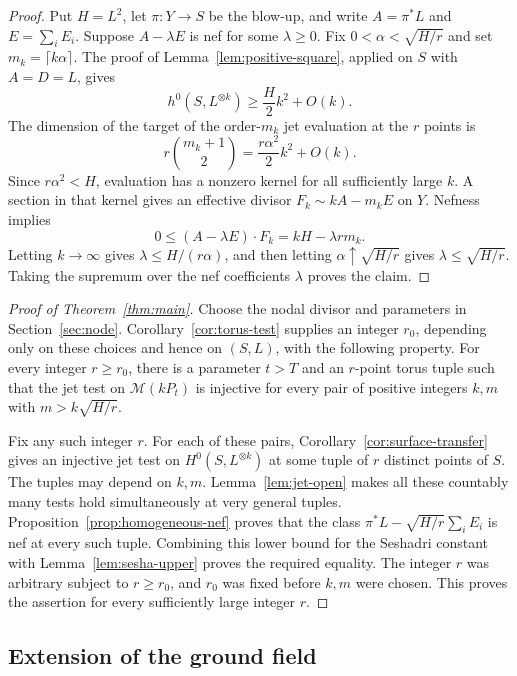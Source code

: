 \begin{proof}
Put $H=L^2$, let $\pi:Y\to S$ be the blow-up, and write
$A=\pi^*L$ and $E=\sum_iE_i$. Suppose $A-\lambda E$ is nef for
some $\lambda\ge0$. Fix $0<\alpha<\sqrt{H/r}$ and set
$m_k=\lceil k\alpha\rceil$. The proof of
Lemma~\ref{lem:positive-square}, applied on $S$ with $A=D=L$,
gives
\[
 h^0(S,L^{\otimes k})\ge \frac{H}{2}k^2+O(k).
\]
The dimension of the target of the order-$m_k$ jet evaluation at
the $r$ points is
\[
 r\binom{m_k+1}{2}=\frac{r\alpha^2}{2}k^2+O(k).
\]
Since $r\alpha^2<H$, evaluation has a nonzero kernel for all
sufficiently large $k$. A section in that kernel gives an effective
divisor $F_k\sim kA-m_kE$ on $Y$. Nefness implies
\[
 0\le(A-\lambda E)\cdot F_k=kH-\lambda r m_k.
\]
Letting $k\to\infty$ gives $\lambda\le H/(r\alpha)$, and then
letting $\alpha\uparrow\sqrt{H/r}$ gives
$\lambda\le\sqrt{H/r}$. Taking the supremum over the nef
coefficients $\lambda$ proves the claim.
\end{proof}

\begin{proof}[Proof of Theorem~\ref{thm:main}]
Choose the nodal divisor and parameters in
Section~\ref{sec:node}. Corollary~\ref{cor:torus-test} supplies an
integer $r_0$, depending only on these choices and hence on $(S,L)$,
with the following property. For every integer $r\ge r_0$, there is
a parameter $t>T$ and an $r$-point torus tuple such that the jet test
on $\mathcal M(kP_t)$ is injective for every pair of positive integers $k,m$
with $m>k\sqrt{H/r}$.

Fix any such integer $r$. For each of these pairs,
Corollary~\ref{cor:surface-transfer} gives an injective jet test on
$H^0(S,L^{\otimes k})$ at some tuple of $r$ distinct points of $S$.
The tuples may depend on $k,m$. Lemma~\ref{lem:jet-open} makes all
these countably many tests hold simultaneously at very general
tuples. Proposition~\ref{prop:homogeneous-nef} proves that the class
$\pi^*L-\sqrt{H/r}\sum_iE_i$ is nef at every such tuple.
Combining this lower bound for the Seshadri constant with
Lemma~\ref{lem:sesha-upper} proves the required equality.
The integer $r$ was arbitrary subject to $r\ge r_0$, and $r_0$
was fixed before $k,m$ were chosen. This proves the assertion for
every sufficiently large integer $r$.
\end{proof}

\subsection{Extension of the ground field}

